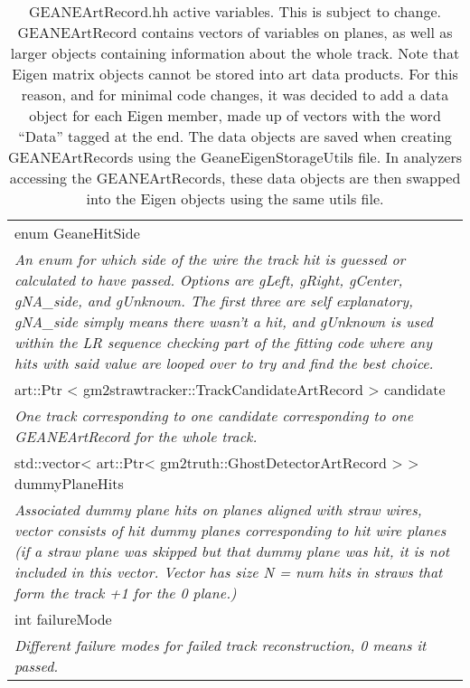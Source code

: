 \begin{longtable}{|p{16cm}|}

\caption{GEANEArtRecord.hh active variables. This is subject to change. GEANEArtRecord contains vectors of variables on planes, as well as larger objects containing information about the whole track. Note that Eigen matrix objects cannot be stored into art data products. For this reason, and for minimal code changes, it was decided to add a data object for each Eigen member, made up of vectors with the word ``Data'' tagged at the end. The data objects are saved when creating GEANEArtRecords using the GeaneEigenStorageUtils file. In analyzers accessing the GEANEArtRecords, these data objects are then swapped into the Eigen objects using the same utils file.}
 
\label{tab:artRecord}


  \\ \hline

enum GeaneHitSide \\ 
\textit{An enum for which side of the wire the track hit is guessed or calculated to have passed. Options are gLeft, gRight, gCenter, gNA\_side, and gUnknown. The first three are self explanatory, gNA\_side simply means there wasn't a hit, and gUnknown is used within the LR sequence checking part of the fitting code where any hits with said value are looped over to try and find the best choice.}

  \\ \hline

art::Ptr \textless{} gm2strawtracker::TrackCandidateArtRecord \textgreater{} candidate \\
\textit{One track corresponding to one candidate corresponding to one GEANEArtRecord for the whole track.} \\ \hline

std::vector\textless{} art::Ptr\textless{} gm2truth::GhostDetectorArtRecord \textgreater{} \textgreater{} dummyPlaneHits \\
\textit{Associated dummy plane hits on planes aligned with straw wires, vector consists of hit dummy planes corresponding to hit wire planes (if a straw plane was skipped but that dummy plane was hit, it is not included in this vector. Vector has size N = num hits in straws that form the track +1 for the 0 plane.)} \\ \hline

int failureMode \\ 
\textit{Different failure modes for failed track reconstruction, 0 means it passed.} \\ \hline


\end{longtable}
